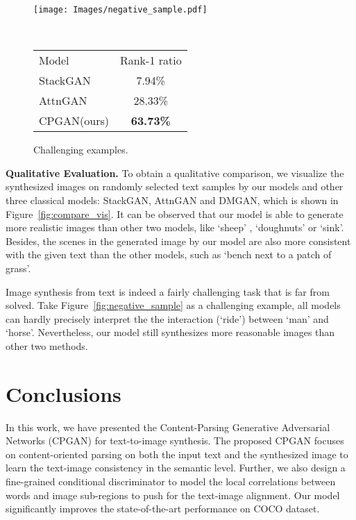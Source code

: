 \documentclass[runningheads]{llncs}
\begin{document}
\begin{figure}[t]
\begin{minipage}[b]{.5\linewidth}
\centering
\texttt{[image: Images/negative\_sample.pdf]}
\caption{Challenging examples. }
\label{fig:negative_sample}
\end{minipage}\quad \ \ 
\begin{minipage}[b]{.45\linewidth}
\begin{scriptsize}
\centering
\begin{tabular}{lc}
\hline\noalign{\smallskip}
Model & Rank-1 ratio\\
\noalign{\smallskip}
\hline
\noalign{\smallskip}
StackGAN~\cite{zhang2017stackgan} &  7.94\% \\
AttnGAN~\cite{xu2018attngan} & 28.33\%\\
CPGAN(ours)& \textbf{63.73\%}\\
\hline
\end{tabular}
\end{scriptsize}
\label{table:human}
\end{minipage}
\end{figure}

\smallskip\noindent\textbf{Qualitative Evaluation.}
To obtain a qualitative comparison, we visualize the synthesized images on randomly selected text samples by our models and other three classical models: StackGAN, AttnGAN and DMGAN, which is shown in Figure~\ref{fig:compare_vis}. It can be observed that our model is able to generate more realistic images than other two models, like `sheep' , `doughnuts' or `sink'. Besides, the scenes in the generated image by our model are also more consistent with the given text than the other models, such as `bench next to a patch of grass'.

\noindent Image synthesis from text is indeed a fairly challenging task that is far from solved. 
Take Figure~\ref{fig:negative_sample} as a challenging example, all models can hardly precisely interpret the the interaction (`ride') between `man' and `horse'. Nevertheless, our model still synthesizes more reasonable images than other two methods.


 
%
 

\section{Conclusions}

In this work, we have presented the Content-Parsing Generative Adversarial Networks (CPGAN) for text-to-image synthesis. The proposed CPGAN focuses on content-oriented parsing on both the input text and the synthesized image to learn the text-image consistency in the semantic level. Further, we also design a fine-grained conditional discriminator to model the local correlations between words and image sub-regions to push for the text-image alignment. Our model significantly improves the state-of-the-art performance on COCO dataset.



\end{document}
